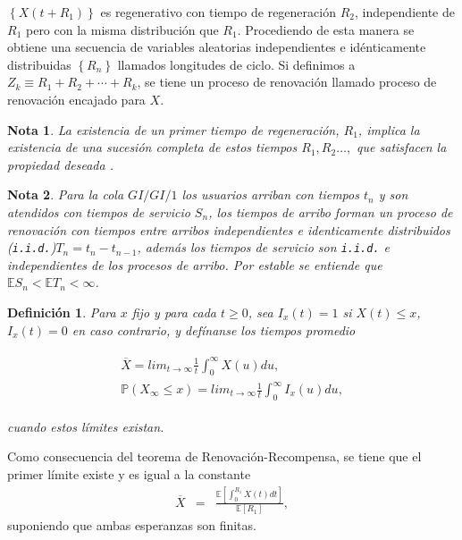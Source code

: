 \documentclass{article}
\newtheorem{Def}{Definición}[section]
\newtheorem{Note}{Nota}%
\newcommand{\esp}{\mathbb{E}}
\newcommand{\prob}{\mathbb{P}}
\numberwithin{equation}{section}
\begin{document}
$\left\{X\left(t+R_{1}\right)\right\}$ es regenerativo con tiempo de regeneraci\'on $R_{2}$, independiente de $R_{1}$ pero con la misma distribuci\'on que $R_{1}$. Procediendo de esta manera se obtiene una secuencia de variables aleatorias independientes e id\'enticamente distribuidas $\left\{R_{n}\right\}$ llamados longitudes de ciclo. Si definimos a $Z_{k}\equiv R_{1}+R_{2}+\cdots+R_{k}$, se tiene un proceso de renovaci\'on llamado proceso de renovaci\'on encajado para $X$.


\begin{Note}
La existencia de un primer tiempo de regeneraci\'on, $R_{1}$, implica la existencia de una sucesi\'on completa de estos tiempos $R_{1},R_{2}\ldots,$ que satisfacen la propiedad deseada \cite{Sigman2}.
\end{Note}


\begin{Note} Para la cola $GI/GI/1$ los usuarios arriban con tiempos $t_{n}$ y son atendidos con tiempos de servicio $S_{n}$, los tiempos de arribo forman un proceso de renovaci\'on  con tiempos entre arribos independientes e identicamente distribuidos (\texttt{i.i.d.})$T_{n}=t_{n}-t_{n-1}$, adem\'as los tiempos de servicio son \texttt{i.i.d.} e independientes de los procesos de arribo. Por \textit{estable} se entiende que $\esp S_{n}<\esp T_{n}<\infty$.
\end{Note}
 

\begin{Def}
Para $x$ fijo y para cada $t\geq0$, sea $I_{x}\left(t\right)=1$ si $X\left(t\right)\leq x$,  $I_{x}\left(t\right)=0$ en caso contrario, y def\'inanse los tiempos promedio

\begin{eqnarray}
\begin{array}{l}
\overline{X}=lim_{t\rightarrow\infty}\frac{1}{t}\int_{0}^{\infty}X\left(u\right)du,\\
\prob\left(X_{\infty}\leq x\right)=lim_{t\rightarrow\infty}\frac{1}{t}\int_{0}^{\infty}I_{x}\left(u\right)du,
\end{array}
\end{eqnarray}

cuando estos l\'imites existan.
\end{Def}

Como consecuencia del teorema de Renovaci\'on-Recompensa, se tiene que el primer l\'imite  existe y es igual a la constante
\begin{eqnarray}
\overline{X}&=&\frac{\esp\left[\int_{0}^{R_{1}}X\left(t\right)dt\right]}{\esp\left[R_{1}\right]},
\end{eqnarray}
suponiendo que ambas esperanzas son finitas.
\end{document}
